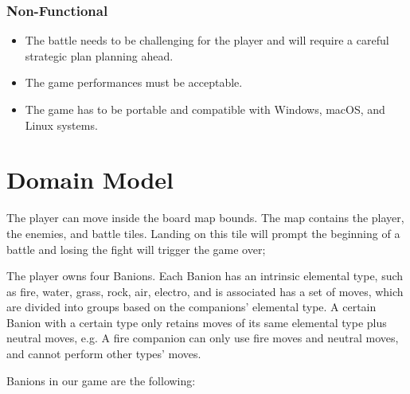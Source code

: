 \documentclass[12pt, a4paper]{report}
\theoremstyle{definition}
\begin{document}
\subsubsection{Non-Functional}

\begin{itemize}
    \item The battle needs to be challenging for the player and will require a careful strategic plan planning ahead. \label{challengingbattle}
    \item The game performances must be acceptable.
    \item The game has to be portable and compatible with Windows, macOS, and Linux systems.
\end{itemize}

\section{Domain Model}

    The player can move inside the board map bounds. The map contains the player, the enemies, and battle tiles.
    Landing on this tile will prompt the beginning of a battle and losing the fight will trigger the game over;

    The player owns four Banions. Each Banion has an intrinsic elemental type, such as fire, water, grass, rock, air, electro,
    and is associated has a set of moves, which are divided into groups based on the companions' elemental type. A certain Banion with a certain
    type only retains moves of its same elemental type plus neutral moves, e.g. A fire companion can only use fire moves and neutral moves,
    and cannot perform other types' moves.

    Banions in our game are the following:
\end{document}
